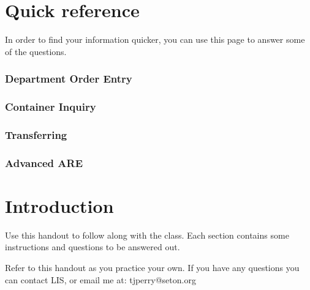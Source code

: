\setcounter{page}{1}

\chapter{Quick reference}

In order to find your information quicker, you can use this page to answer some of the questions.



\subsection{Department Order Entry}

\subsection{Container Inquiry}

\subsection{Transferring}

\subsection{Advanced ARE}
\clearpage

\chapter{Introduction}
Use this handout to follow along with the class. Each section contains some instructions and questions to be answered out.

Refer to this handout as you practice your own. If you have any questions you can contact LIS, or email me at:{\color{teal900} { tjperry@seton.org}}





